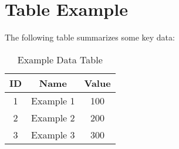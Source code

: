 \section{Table Example}
The following table summarizes some key data:

\begin{table}[h!]
\centering
\begin{tabular}{|c|c|c|}
\hline
\textbf{ID} & \textbf{Name} & \textbf{Value} \\
\hline
1 & Example 1 & 100 \\
2 & Example 2 & 200 \\
3 & Example 3 & 300 \\
\hline
\end{tabular}
\caption{Example Data Table}
\end{table}
